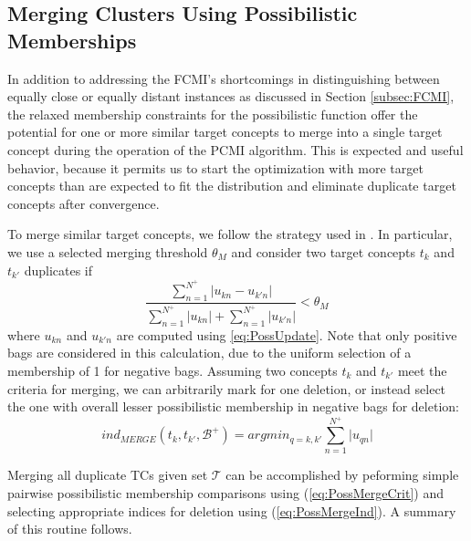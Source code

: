 \documentclass[12pt,dvips]{report}
\numberwithin{equation}{section}
\begin{document}
\subsection{Merging Clusters Using Possibilistic Memberships} \label{subsec:selmerge}
In addition to addressing the FCMI's shortcomings in distinguishing between equally close or equally distant instances as discussed in Section \ref{subsec:FCMI}, the relaxed membership constraints for the possibilistic function offer the potential for one or more similar target concepts to merge into a single target concept during the operation of the PCMI algorithm.  This is expected and useful behavior, because it permits us to start the optimization with more target concepts than are expected to fit the distribution and eliminate duplicate target concepts after convergence.

To merge similar target concepts, we follow the strategy used in \cite{ismail2010possibilistic,trabelsi2019robust}.  In particular, we use a selected merging threshold $\theta_M$ and consider two target concepts $t_k$ and $t_{k'}$ duplicates if
\begin{equation} \label{eq:PossMergeCrit}
\frac{\sum^{N^+}_{n=1}\vert u_{kn}-u_{k'n}\vert }{\sum^{N^+}_{n=1}\vert u_{kn}\vert +\sum^{N^+}_{n=1}\vert u_{k'n}\vert } < \theta_M
\end{equation} where $u_{kn}$ and $u_{k'n}$ are computed using \ref{eq:PossUpdate}.  Note that only positive bags are considered in this calculation, due to the uniform selection of a membership of 1 for negative bags.  Assuming two concepts $t_k$ and $t_{k'}$ meet the criteria for merging, we can arbitrarily mark for one deletion, or instead select the one with overall lesser possibilistic membership in negative bags for deletion:
\begin{equation} \label{eq:PossMergeInd}
ind_{MERGE}(t_k,t_{k'},\mathcal{B}^+)= argmin_{q=k,k'}{\sum^{N^+}_{n=1}\vert u_{qn}\vert }
\end{equation}

Merging all duplicate TCs given set $\mathcal{T}$ can be accomplished by peforming simple pairwise possibilistic membership comparisons using (\ref{eq:PossMergeCrit}) and selecting appropriate indices for deletion using (\ref{eq:PossMergeInd}).  A summary of this routine follows.
\end{document}
